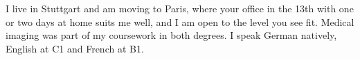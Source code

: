 {	I live in Stuttgart and am moving to Paris, where your office in the 13th with one or two days at home suits me well, and I am open to the level you see fit. Medical imaging was part of my coursework in both degrees. I speak German natively, English at C1 and French at B1.

}
